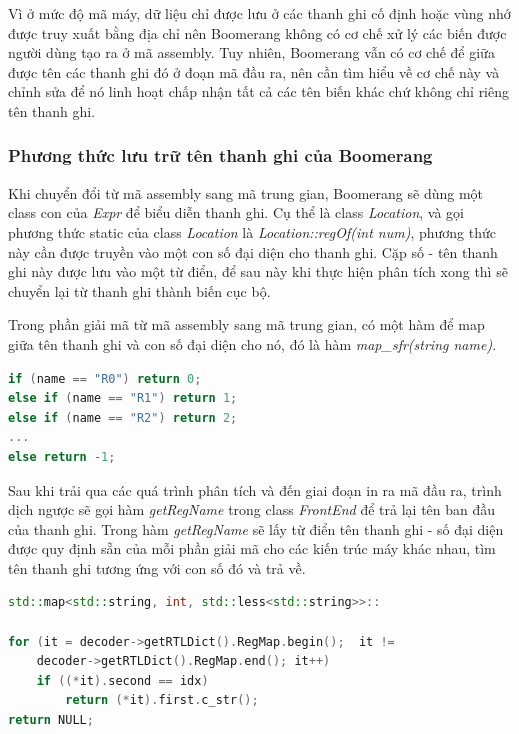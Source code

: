 Vì ở mức độ mã máy, dữ liệu chỉ được lưu ở các thanh ghi cố định hoặc vùng nhớ được truy xuất bằng địa chỉ nên Boomerang không có cơ chế xử lý các biến được người dùng tạo ra ở mã assembly. Tuy nhiên, Boomerang vẫn có cơ chế để giữa được tên các thanh ghi đó ở đoạn mã đầu ra, nên cần tìm hiểu về cơ chế này và chỉnh sửa để nó linh hoạt chấp nhận tất cả các tên biến khác chứ không chỉ riêng tên thanh ghi.

\subsubsection{Phương thức lưu trữ tên thanh ghi của Boomerang}
Khi chuyển đổi từ mã assembly sang mã trung gian, Boomerang sẽ dùng một class con của \textit{Expr} để biểu diễn thanh ghi. Cụ thể là class \textit{Location}, và gọi phương thức static của class \textit{Location} là \textit{Location::regOf(int num)}, phương thức này cần được truyền vào một con số đại diện cho thanh ghi. Cặp số - tên thanh ghi này được lưu vào một từ điển, để sau này khi thực hiện phân tích xong thì sẽ chuyển lại từ thanh ghi thành biến cục bộ.

Trong phần giải mã từ mã assembly sang mã trung gian, có một hàm để map giữa tên thanh ghi và con số đại diện cho nó, đó là hàm \textit{map\_sfr(string name)}.
\begin{lstlisting}[caption={Một số phần mã trong hàm map\_sfr},label={list:listmapsfr},language=c++]
if (name == "R0") return 0;
else if (name == "R1") return 1;
else if (name == "R2") return 2;
...
else return -1;

\end{lstlisting}

Sau khi trải qua các quá trình phân tích và đến giai đoạn in ra mã đầu ra, trình dịch ngược sẽ gọi hàm \textit{getRegName} trong class \textit{FrontEnd} để trả lại tên ban đầu của thanh ghi. Trong hàm \textit{getRegName} sẽ lấy từ điển tên thanh ghi - số đại diện được quy định sẵn của mỗi phần giải mã cho các kiến trúc máy khác nhau, tìm tên thanh ghi tương ứng với con số đó và trả về.
\begin{lstlisting}[caption={Phần mã trong hàm getRegName},label={list:listgetregname},language=c++]
std::map<std::string, int, std::less<std::string>>::
																				iterator it;
for (it = decoder->getRTLDict().RegMap.begin();	 it != 										
	decoder->getRTLDict().RegMap.end(); it++)
	if ((*it).second == idx) 
		return (*it).first.c_str();
return NULL;
\end{lstlisting}


